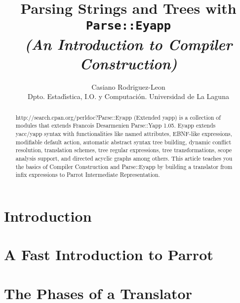 \documentclass[times, 10pt,%
]{article}
\title{Parsing Strings and Trees with {\tt Parse::Eyapp}\\
\it (An Introduction to Compiler Construction)}
\author{
Casiano Rodriguez-Leon\\
Dpto. Estad\'{\i}stica, I.O. y Computaci\'{o}n.
Universidad de La Laguna
}
\newcommand{\cpan}[1]
 {\htmladdnormallink{#1}
 {http://search.cpan.org/perldoc?#1}}
\begin{document}
\maketitle



%

\begin{abstract}
\cpan{Parse::Eyapp} (Extended yapp) is a collection of modules
that extends Francois Desarmenien Parse::Yapp 1.05.
Eyapp extends yacc/yapp syntax with 
functionalities like named attributes,
EBNF-like expressions, modifiable default action,
automatic abstract syntax tree building,
dynamic conflict resolution,
translation schemes, tree regular expressions,
tree transformations, scope analysis support,
and directed acyclic graphs among others.
This article teaches you the basics of 
Compiler Construction and Parse::Eyapp by
building a translator from infix expressions to Parrot 
Intermediate Representation.
\end{abstract}


\section{Introduction}
\label{section:introduction}


\section{A Fast Introduction to Parrot}
\label{section:parrot}


\section{The Phases of a Translator}
\label{section:phases}

\end{document}
